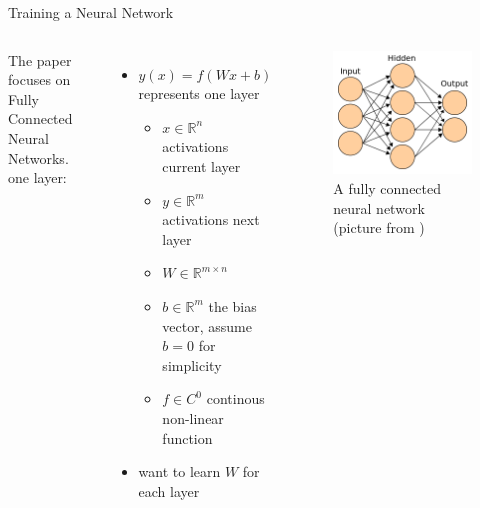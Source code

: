 \documentclass[aspectratio=169]{beamer}
\begin{document}
\begin{frame}{Training a Neural Network}
\begin{columns}
	The paper \href{https://arxiv.org/abs/1706.02515}{\color{blue}{Self-Normalizing Neural Networks}} focuses on Fully Connected 		Neural Networks. 
	\\

	one layer:
	\begin{itemize}
	\item $ y(x) = f(W x + b) $ represents one layer
	\begin{itemize}
	\item $x \in \mathbb{R}^{n}$ activations current layer
	\item $y \in \mathbb{R}^{m}$ activations next layer
	\item $W \in  \mathbb{R}^{m \times n}$
	\item $b \in \mathbb{R}^m $ the bias vector, assume $b = 0$ for simplicity
	\item $f \in C^{0} $ continous non-linear function
	\end{itemize}
	\item want to learn $W$ for each layer
	\end{itemize}
	\begin{figure}[h!]
	\caption{A fully connected neural network (picture from \href{https://commons.wikimedia.org/wiki/File:Artificial_neural_network.svg}{\color{blue}{here}})}

	\includegraphics[width=\linewidth]{images/neural_network.png}
	\end{figure}
\end{columns}
\end{frame}
\end{document}
